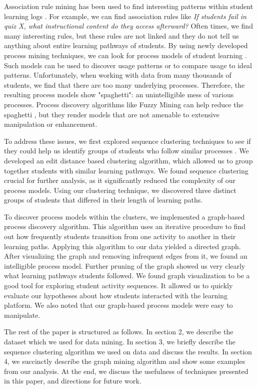 \documentclass{edm_template}
\begin{document}
Association rule mining has been used to find interesting patterns within student learning logs \cite{garcia2011association}. For example, we can find association rules like \textit{If students fail in quiz X, what instructional content do they access afterward?} Often times, we find many interesting rules, but these rules are not linked and they do not tell us anything about entire learning pathways of students. By using newly developed process mining techniques, we can look for process models of student learning \cite{mukala2015exploring, trcka2010process}. Such models can be used to discover usage patterns or to compare usage to ideal patterns. Unfortunately, when working with data from many thousands of students, we find that there are too many underlying processes. Therefore, the resulting process models show "spaghetti": an unintelligible mess of various processes. Process discovery algorithms like Fuzzy Mining can help reduce the spaghetti \cite{gunther2007fuzzy}, but they render models that are not amenable to extensive manipulation or enhancement.

To address these issues, we first explored sequence clustering techniques to see if they could help us identify groups of students who follow similar processes \cite{hompesdiscovering}. We developed an edit distance based clustering algorithm, which allowed us to group together students with similar learning pathways. We found sequence clustering crucial for further analysis, as it significantly reduced the complexity of our process models. Using our clustering technique, we discovered three distinct groups of students that differed in their length of learning paths.

To discover process models within the clusters, we implemented a graph-based process discovery algorithm. This algorithm uses an iterative procedure to find out how frequently students transition from one activity to another in their learning paths. Applying this algorithm to our data yielded a directed graph. After visualizing the graph and removing infrequent edges from it, we found an intelligible process model. Further pruning of the graph showed us very clearly what learning pathways students followed. We found graph visualization to be a good tool for exploring student activity sequences. It allowed us to quickly evaluate our hypotheses about how students interacted with the learning platform. We also noted that our graph-based process models were easy to manipulate.

The rest of the paper is structured as follows. In section 2, we describe the dataset which we used for data mining. In section 3, we briefly describe the sequence clustering algorithm we used on data and discuss the results. In section 4, we succinctly describe the graph mining algorithm and show some examples from our analysis. At the end, we discuss the usefulness of techniques presented in this paper, and directions for future work.
\end{document}
